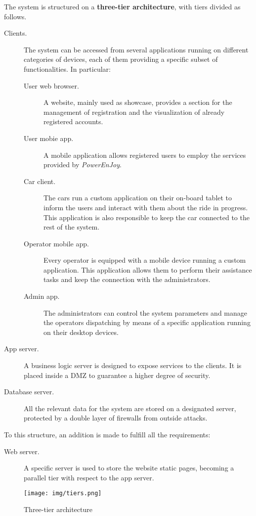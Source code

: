 The system is structured on a \textbf{three-tier architecture}, with tiers divided as follows.
\begin{description}
	\item[Clients.] The system can be accessed from several applications running on different categories of devices, each of them providing a specific subset of functionalities. In particular:
	\begin{description}
		\item[User web browser.] A website, mainly used as showcase, provides a section for the management of registration and the visualization of already registered accounts.
		\item[User mobie app.] A mobile application allows registered users to employ the services provided by \textit{PowerEnJoy}.
		\item[Car client.] The cars run a custom application on their on-board tablet to inform the users and interact with them about the ride in progress. This application is also responsible to keep the car connected to the rest of the system.
		\item[Operator mobile app.] Every operator is equipped with a mobile device running a custom application. This application allows them to perform their assistance tasks and keep the connection with the administrators.
		\item[Admin app.] The administrators can control the system parameters and manage the operators dispatching by means of a specific application running on their desktop devices.
	\end{description}
	\item[App server.] A business logic server is designed to expose services to the clients. It is placed inside a DMZ to guarantee a higher degree of security.
	\item[Database server.] All the relevant data for the system are stored on a designated server, protected by a double layer of firewalls from outside attacks.
\end{description}
To this structure, an addition is made to fulfill all the requirements:
	\begin{description}
		\item[Web server.] A specific server is used to store the website static pages, becoming a parallel tier with respect to the app server.
	\end{description}

\begin{figure}[h]
	\texttt{[image: img/tiers.png]} %
	\caption{Three-tier architecture}
\end{figure}
\FloatBarrier


